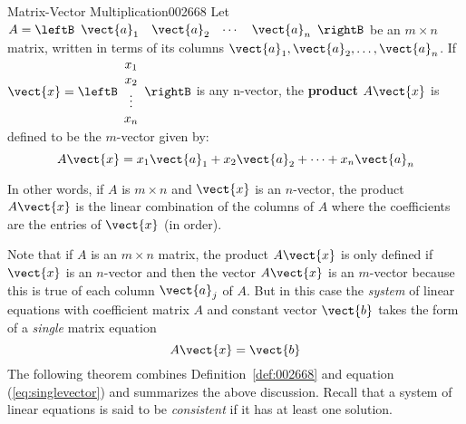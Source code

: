 \begin{definition}{Matrix-Vector Multiplication}{002668}
Let $A = \leftB \begin{array}{cccc}
\vect{a}_{1} & \vect{a}_{2} & \cdots & \vect{a}_{n}
\end{array} \rightB$ be an $m \times n$ matrix, written in terms of its columns $\vect{a}_{1}, \vect{a}_{2}, \dots, \vect{a}_{n}$. If $\vect{x} = \leftB \begin{array}{c}
x_{1} \\
x_{2} \\
\vdots \\
x_{n}
\end{array} \rightB$
 is any n-vector, the \textbf{product} $A\vect{x}$ is defined to be the $m$-vector given by:
\begin{equation*}
A\vect{x} = x_{1}\vect{a}_{1} + x_{2}\vect{a}_{2} + \cdots + x_{n}\vect{a}_{n}
\end{equation*}
\end{definition}


\noindent In other words, if $A$ is $m \times n$ and $\vect{x}$ is an $n$-vector, the product $A\vect{x}$ is the linear combination of the columns of $A$ where the coefficients are the entries of $\vect{x}$ (in order).


Note that if $A$ is an $m \times n$ matrix, the product $A\vect{x}$ is only defined if $\vect{x}$ is an $n$-vector and then the vector $A\vect{x}$ is an $m$-vector because this is true of each column $\vect{a}_{j}$ of $A$. But in this case the \textit{system} of linear equations with coefficient matrix $A$ and constant vector $\vect{b}$ takes the form of a \textit{single} matrix equation
\begin{equation*}
A\vect{x} = \vect{b}
\end{equation*}
The following theorem combines Definition~\ref{def:002668} and equation (\ref{eq:singlevector}) and summarizes the above discussion. Recall that a system of linear equations is said to be \textit{consistent} if it has at least one solution.


